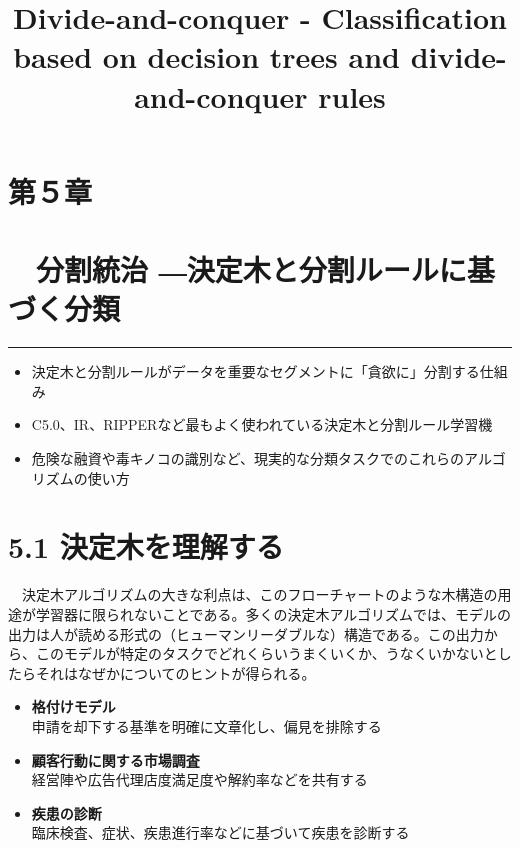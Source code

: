 \documentclass[
]{article}
\title{Divide-and-conquer - Classification based on decision trees and
divide-and-conquer rules}
\author{}
\date{\vspace{-2.5em}}
\begin{document}
\maketitle

\section{第５章}\label{ux7b2cuxff15ux7ae0}

\section{　分割統治
―決定木と分割ルールに基づく分類}\label{ux5206ux5272ux7d71ux6cbb-ux6c7aux5b9aux6728ux3068ux5206ux5272ux30ebux30fcux30ebux306bux57faux3065ux304fux5206ux985e}

\begin{center}\rule{0.5\linewidth}{0.5pt}\end{center}

\begin{itemize}
\item
  決定木と分割ルールがデータを重要なセグメントに「貪欲に」分割する仕組み
\item
  C5.0、IR、RIPPERなど最もよく使われている決定木と分割ルール学習機
\item
  危険な融資や毒キノコの識別など、現実的な分類タスクでのこれらのアルゴリズムの使い方
\end{itemize}

\section{5.1
決定木を理解する}\label{ux6c7aux5b9aux6728ux3092ux7406ux89e3ux3059ux308b}

　決定木アルゴリズムの大きな利点は、このフローチャートのような木構造の用途が学習器に限られないことである。多くの決定木アルゴリズムでは、モデルの出力は人が読める形式の（ヒューマンリーダブルな）構造である。この出力から、このモデルが特定のタスクでどれくらいうまくいくか、うなくいかないとしたらそれはなぜかについてのヒントが得られる。

\begin{itemize}
\item
  \textbf{格付けモデル}\\
  申請を却下する基準を明確に文章化し、偏見を排除する
\item
  \textbf{顧客行動に関する市場調査}\\
  経営陣や広告代理店度満足度や解約率などを共有する
\item
  \textbf{疾患の診断}\\
  臨床検査、症状、疾患進行率などに基づいて疾患を診断する
\end{itemize}
\end{document}
